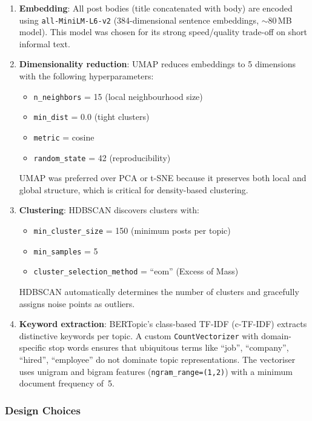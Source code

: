 \documentclass[11pt,a4paper]{article}
\begin{document}
\begin{enumerate}[leftmargin=*]
  \item \textbf{Embedding}: All post bodies (title concatenated with body) are encoded using \texttt{all-MiniLM-L6-v2} (384-dimensional sentence embeddings, $\sim$80\,MB model). This model was chosen for its strong speed/quality trade-off on short informal text.
  
  \item \textbf{Dimensionality reduction}: UMAP reduces embeddings to 5 dimensions with the following hyperparameters:
  \begin{itemize}
    \item \texttt{n\_neighbors} = 15 (local neighbourhood size)
    \item \texttt{min\_dist} = 0.0 (tight clusters)
    \item \texttt{metric} = cosine
    \item \texttt{random\_state} = 42 (reproducibility)
  \end{itemize}
  UMAP was preferred over PCA or t-SNE because it preserves both local and global structure, which is critical for density-based clustering.

  \item \textbf{Clustering}: HDBSCAN discovers clusters with:
  \begin{itemize}
    \item \texttt{min\_cluster\_size} = 150 (minimum posts per topic)
    \item \texttt{min\_samples} = 5
    \item \texttt{cluster\_selection\_method} = ``eom'' (Excess of Mass)
  \end{itemize}
  HDBSCAN automatically determines the number of clusters and gracefully assigns noise points as outliers.

  \item \textbf{Keyword extraction}: BERTopic's class-based TF-IDF (c-TF-IDF) extracts distinctive keywords per topic. A custom \texttt{CountVectorizer} with domain-specific stop words ensures that ubiquitous terms like ``job'', ``company'', ``hired'', ``employee'' do not dominate topic representations. The vectoriser uses unigram and bigram features (\texttt{ngram\_range=(1,2)}) with a minimum document frequency of~5.
\end{enumerate}

\subsubsection{Design Choices}
\end{document}
